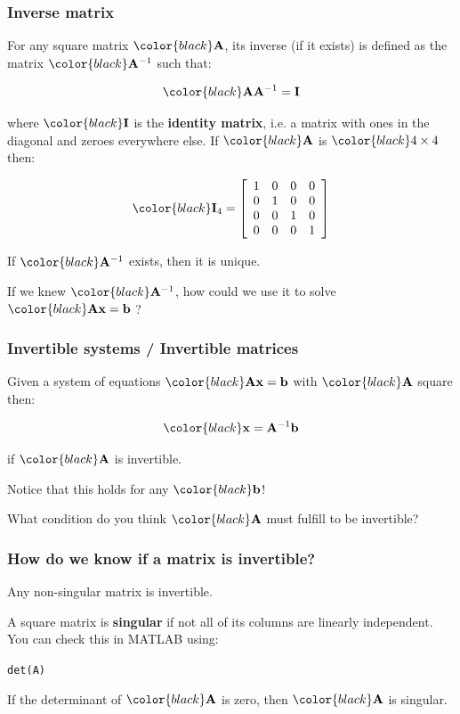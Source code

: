 \documentclass[compress]{beamer}
\newcommand{\black}[1]{{\color{black}#1}}
\renewcommand{\emph}[1]{\textbf{\black{#1}}}
\newcommand{\beq}[1]{\[\black{#1}\]}
\begin{document}
\begin{frame}
\frametitle{Inverse matrix}


For any square matrix $\black{\A}$, its inverse (if it exists) is defined as the matrix $\black{\A^{-1}}$ such that:

\beq{
\A\A^{-1}=\I
}

where $\black{\I}$ is the \emph{identity matrix}, i.e. a matrix with ones in the diagonal and zeroes everywhere else. If $\black{\A}$ is $\black{4\times 4}$ then:

\beq{
\I_{4} = \left[
\begin{array}{cccc}
1 & 0 & 0 & 0\\
0 & 1 & 0 & 0\\
0 & 0 & 1 & 0\\
0 & 0 & 0 & 1
\end{array}
\right]
}

\vspace{.5cm}
If $\black{\A^{-1}}$ exists, then it is unique.

\vspace{.5cm}
If we knew $\black{\A^{-1}}$, how could we use it to solve $\black{\A\x=\b}$ ?

\end{frame}



\begin{frame}
\frametitle{Invertible systems / Invertible matrices}

Given a system of equations $\black{\A\x=\b}$ with $\black{\A}$ square then: 

\beq{
\x = \A^{-1}\b
}

if $\black{\A}$ is invertible. 

\vspace{.5cm}
Notice that this holds for any $\black{\b}$!

\vspace{.5cm}
What condition do you think $\black{\A}$ must fulfill to be invertible?

\end{frame}


\begin{frame}[fragile]
\frametitle{How do we know if a matrix is invertible?}

Any non-singular matrix is invertible. 

\vspace{.5cm}
A square matrix is \emph{singular} if not all of its columns are linearly independent. You can check this in MATLAB using:

\vspace{.5cm}
\color{black}\verb|det(A)|\color{gray}

\vspace{.5cm}
If the determinant of $\black{\A}$ is zero, then $\black{\A}$ is singular.


\end{frame}
\end{document}
